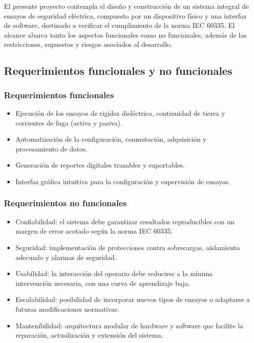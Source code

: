 \documentclass[a4paper,12pt]{article}
\begin{document}
El presente proyecto contempla el diseño y construcción de un sistema integral de ensayos de seguridad eléctrica, compuesto por un dispositivo físico y una interfaz de software, destinado a verificar el cumplimiento de la norma IEC 60335. El alcance abarca tanto los aspectos funcionales como no funcionales, además de las restricciones, supuestos y riesgos asociados al desarrollo.

\subsection{Requerimientos funcionales y no funcionales}

\subsubsection{Requerimientos funcionales}
\begin{itemize}
    \item Ejecución de los ensayos de rigidez dieléctrica, continuidad de tierra y corrientes de fuga (activa y pasiva).
    \item Automatización de la configuración, conmutación, adquisición y procesamiento de datos.
    \item Generación de reportes digitales trazables y exportables.
    \item Interfaz gráfica intuitiva para la configuración y supervisión de ensayos.
\end{itemize}

\subsubsection{Requerimientos no funcionales}
\begin{itemize}
    \item Confiabilidad: el sistema debe garantizar resultados reproducibles con un margen de error acotado según la norma IEC 60335.
    \item Seguridad: implementación de protecciones contra sobrecargas, aislamiento adecuado y alarmas de seguridad.
    \item Usabilidad: la interacción del operario debe reducirse a la mínima intervención necesaria, con una curva de aprendizaje baja.
    \item Escalabilidad: posibilidad de incorporar nuevos tipos de ensayos o adaptarse a futuras modificaciones normativas.
    \item Mantenibilidad: arquitectura modular de hardware y software que facilite la reparación, actualización y extensión del sistema.
\end{itemize}
\end{document}
